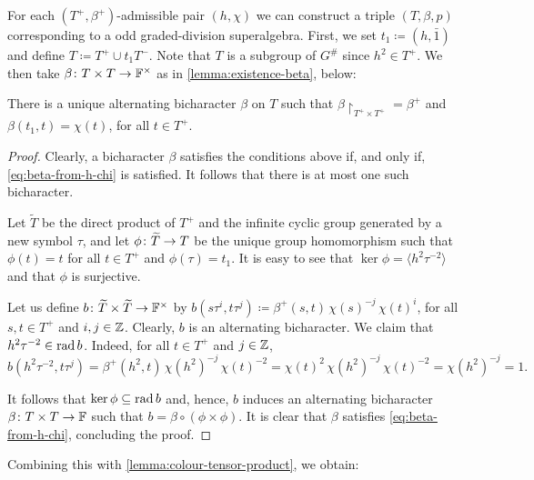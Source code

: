 For each $(T^+, \beta^+)$-admissible pair $(h, \chi)$ we can construct a triple $(T, \beta, p)$ corresponding to a odd graded-division superalgebra. 
First, we set $t_1 \coloneqq (h, \bar 1)$ and define $T \coloneqq T^+ \cup t_1 T^-$. 
Note that $T$ is a subgroup of $G^\#$ since $h^2 \in T^+$. 
We then take $\beta\colon T\times T \to \mathbb{F}^\times$ as in \cref{lemma:existence-beta}, below:

\begin{lemma}\label{lemma:existence-beta}
    There is a unique alternating bicharacter $\beta$ on $T$ such that $\beta\restriction_{T^+ \times T^+} = \beta^+$ and $\beta(t_1, t) = \chi(t)$, for all $t\in T^+$.
\end{lemma}

\begin{proof}
    Clearly, a bicharacter $\beta$ satisfies the conditions above if, and only if, \cref{eq:beta-from-h-chi} is satisfied. 
    It follows that there is at most one such bicharacter. 
    
    
    Let $\widetilde T$ be the direct product of $T^+$ and the infinite cyclic group generated by a new symbol $\tau$, and let $\phi \colon \widetilde T \to T$ be the unique group homomorphism such that $\phi(t) = t$ for all $t\in T^+$ and $\phi(\tau) = t_1$. 
    It is easy to see that $\ker \phi = \langle h^2 \tau^{-2} \rangle$ and that $\phi$ is surjective. 
    
    Let us define $b\colon \widetilde T\times \widetilde T \rightarrow \mathbb{F}^\times$ by $b(s\tau^i,t\tau^j) \coloneqq \beta^+(s,t)\, \chi (s)^{-j}\, \chi (t)^i$, for all $s,t\in T^+$ and $i,j \in \mathbb{Z}$. 
    Clearly, $b$ is an alternating bicharacter. 
    We claim that $h^2 \tau^{-2} \in \operatorname{rad} b$. 
    Indeed, for all $t \in T^+$ and $j \in \mathbb{Z}$,
    \[%
        b(h^2 \tau^{-2},t\tau^j) = \beta^+(h^2,t)\, \chi (h^2)^{-j}\, \chi (t)^{-2} = \chi (t)^{2}\, \chi (h^2)^{-j}\, \chi (t)^{-2} = \chi (h^2)^{-j} = 1.
    \]%
    
    It follows that $\ker \phi \subseteq \operatorname{rad} b$ and, hence, $b$ induces an alternating bicharacter $\beta\colon T\times T \to \mathbb{F}$ such that $b = \beta \circ (\phi \times \phi)$. 
    It is clear that $\beta$ satisfies \cref{eq:beta-from-h-chi}, concluding the proof.
\end{proof}

Combining this with \cref{lemma:colour-tensor-product}, we obtain:

